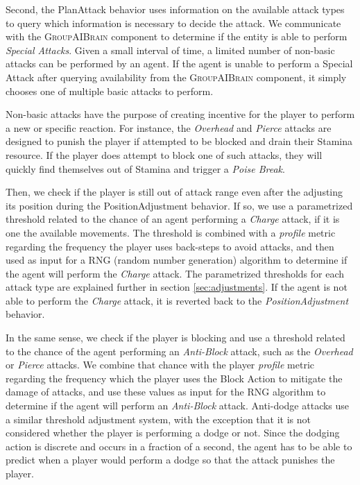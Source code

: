 Second, the PlanAttack behavior uses information on the available attack types to query which information is necessary to decide the attack. We communicate with the \textsc{GroupAIBrain} component to determine if the entity is able to perform \emph{Special Attacks}. Given a small interval of time, a limited number of non-basic attacks can be performed by an agent. If the agent is unable to perform a Special Attack after querying availability from the \textsc{GroupAIBrain} component, it simply chooses one of multiple basic attacks to perform.

Non-basic attacks have the purpose of creating incentive for the player to perform a new or specific reaction. For instance, the \emph{Overhead} and \emph{Pierce} attacks are designed to punish the player if attempted to be blocked and drain their Stamina resource. If the player does attempt to block one of such attacks, they will quickly find themselves out of Stamina and trigger a \emph{Poise Break}.

Then, we check if the player is still out of attack range even after the adjusting its position during the PositionAdjustment behavior. If so, we use a parametrized threshold related to the chance of an agent performing a \emph{Charge} attack, if it is one the available movements. The threshold is combined with a \emph{profile} metric regarding the frequency the player uses back-steps to avoid attacks, and then used as input for a RNG (random number generation) algorithm to determine if the agent will perform the \emph{Charge} attack. The parametrized thresholds for each attack type are explained further in section \ref{sec:adjustments}. If the agent is not able to perform the \emph{Charge} attack, it is reverted back to the \emph{PositionAdjustment} behavior.

In the same sense, we check if the player is blocking and use a threshold related to the chance of the agent performing an \emph{Anti-Block} attack, such as the \emph{Overhead} or \emph{Pierce} attacks. We combine that chance with the player \emph{profile} metric regarding the frequency which the player uses the Block Action to mitigate the damage of attacks, and use these values as input for the RNG algorithm to determine if the agent will perform an \emph{Anti-Block} attack. Anti-dodge attacks use a similar threshold adjustment system, with the exception that it is not considered whether the player is performing a dodge or not. Since the dodging action is discrete and occurs in a fraction of a second, the agent has to be able to predict when a player would perform a dodge so that the attack punishes the player.

